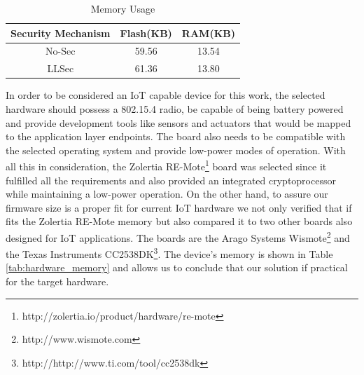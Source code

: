 \documentclass{sig-alternate-05-2015}
\newcommand{\legend}[2][]{
    \begin{scope}[#1]
    \path
        \foreach \n/\s in {#2}
            {
                  ++(0,-10pt) node[\s,legend box] {} +(5pt,0) node[legend label] {\n}
            }
    ;
    \end{scope}
}
\begin{document}
\begin{table}
\centering
\caption{Memory Usage}
\label{tab:space_req}
\begin{tabular}{|c|c|c|} \hline
Security Mechanism&Flash(KB)&RAM(KB)\\ \hline
No-Sec& 59.56& 13.54\\ \hline
LLSec& 61.36& 13.80\\ %
\hline\end{tabular}
\end{table}


In order to be considered an \gls{IoT} capable device for this work, the selected hardware should possess a 802.15.4 radio, be capable of being battery powered and provide development tools like sensors and actuators that would be mapped to the application layer endpoints. The board also needs to be compatible with the selected operating system and provide low-power modes of operation. With all this in consideration, the Zolertia RE-Mote\footnote{http://zolertia.io/product/hardware/re-mote} board was selected since it fulfilled all the requirements and also provided an integrated cryptoprocessor while maintaining a low-power operation.
On the other hand, to assure our firmware size is a proper fit for current \gls{IoT} hardware we not only verified that if fits the Zolertia RE-Mote memory but also compared it to two other boards also designed for \gls{IoT} applications. The boards are the Arago Systems Wismote\footnote{http://www.wismote.com} and the Texas Instruments CC2538DK\footnote{http://http://www.ti.com/tool/cc2538dk}. The device's memory is shown in Table \ref{tab:hardware_memory} and allows us to conclude that our solution if practical for the target hardware.
\end{document}
